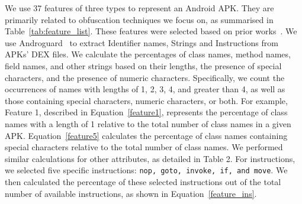 We use 37 features of three types to represent an Android APK. They are primarily related to obfuscation techniques we focus on, as summarised in Table~\ref{tab:feature_list}. These features were selected based on prior works~\cite{mirzaei2019androdet, conti2022obfuscation}. We use Androguard~\cite{desnos2018androguard} to extract Identifier names, Strings and Instructions from APKs' DEX files. We calculate the percentages of class names, method names, field names, and other strings based on their lengths, the presence of special characters, and the presence of numeric characters. Specifically, we count the occurrences of names with lengths of 1, 2, 3, 4, and greater than 4, as well as those containing special characters, numeric characters, or both. For example, Feature 1, described in Equation~\eqref{feature1}, represents the percentage of class names with a length of 1 relative to the total number of class names in a given APK. Equation~\eqref{feature5} calculates the percentage of class names containing special characters relative to the total number of class names. We performed similar calculations for other attributes, as detailed in Table 2. For instructions, we selected five specific instructions: \texttt{nop, goto, invoke, if, and move}. We then calculated the percentage of these selected instructions out of the total number of available instructions, as shown in Equation~\eqref{feature_ins}.


